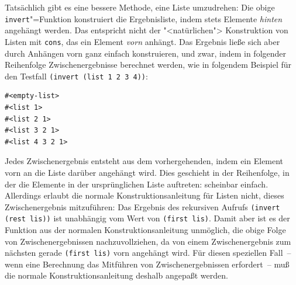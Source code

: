 Tatsächlich gibt es eine bessere Methode, eine Liste umzudrehen: Die
obige \texttt{invert}"=Funktion konstruiert die Ergebnisliste, indem
stets Elemente \emph{hinten} angehängt werden.  Das entspricht 
nicht der "<natürlichen"> Konstruktion von Listen mit
\texttt{cons}, das ein Element \emph{vorn} anhängt.  
Das Ergebnis ließe sich aber durch Anhängen vorn ganz einfach
konstruieren, und zwar, indem in folgender Reihenfolge
Zwischenergebnisse berechnet werden, wie in folgendem Beispiel für den
Testfall \texttt{(invert (list 1 2 3 4))}:
%
\begin{verbatim}
#<empty-list>
#<list 1>
#<list 2 1>
#<list 3 2 1>
#<list 4 3 2 1>
\end{verbatim}
%
Jedes Zwischenergebnis entsteht aus dem vorhergehenden, indem ein
Element vorn an die Liste darüber angehängt wird.  Dies geschieht in
der Reihenfolge, in der die Elemente in der ursprünglichen Liste
auftreten: scheinbar einfach.  Allerdings erlaubt die normale
Konstruktionsanleitung für Listen nicht, dieses Zwischenergebnis
mitzuführen: Das Ergebnis des rekursiven Aufrufs \texttt{(invert (rest
  lis))} ist unabhängig vom Wert von \texttt{(first lis)}.  Damit aber
ist es der Funktion aus der normalen Konstruktionsanleitung unmöglich,
die obige Folge von Zwischenergebnissen nachzuvollziehen, da von einem
Zwischenergebnis zum nächsten gerade \texttt{(first lis)} vorn
angehängt wird.  Für diesen speziellen Fall~-- wenn eine Berechnung das
Mitführen von Zwischenergebnissen erfordert~-- muß die normale
Konstruktionsanleitung deshalb angepaßt werden.

